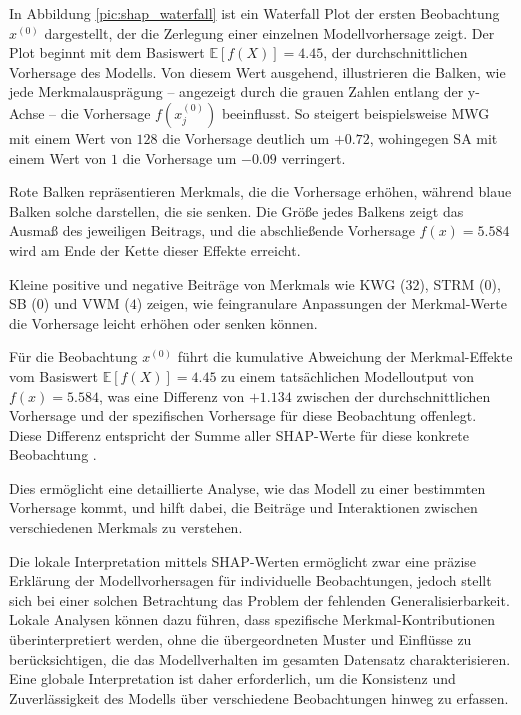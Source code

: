 In Abbildung \ref{pic:shap_waterfall} ist ein Waterfall Plot der ersten Beobachtung $x^{(0)}$ dargestellt, 
der die Zerlegung einer einzelnen Modellvorhersage zeigt. Der Plot beginnt mit dem Basiswert $\mathbb{E}[f(X)] = 4.45$, 
der durchschnittlichen Vorhersage des Modells.
Von diesem Wert ausgehend, illustrieren die Balken, wie jede Merkmalausprägung – 
angezeigt durch die grauen Zahlen entlang der y-Achse – die Vorhersage $f(x_{j}^{(0)})$ beeinflusst. 
So steigert beispielsweise MWG mit einem Wert von $128$ die Vorhersage deutlich um $+0.72$, 
wohingegen SA mit einem Wert von $1$ die Vorhersage um $-0.09$ verringert.

Rote Balken repräsentieren Merkmals, die die Vorhersage erhöhen, während blaue Balken solche 
darstellen, die sie senken. Die Größe jedes Balkens zeigt das Ausmaß des jeweiligen Beitrags, 
und die abschließende Vorhersage $f(x) = 5.584$ wird am Ende der Kette dieser Effekte erreicht. 

Kleine positive und negative Beiträge von Merkmals wie KWG ($32$), STRM ($0$), SB ($0$) und VWM ($4$) 
zeigen, wie feingranulare Anpassungen der Merkmal-Werte die Vorhersage leicht erhöhen oder senken können.

Für die Beobachtung $x^{(0)}$ führt die kumulative Abweichung der Merkmal-Effekte 
vom Basiswert $\mathbb{E}[f(X)] = 4.45$ zu einem tatsächlichen Modelloutput von $f(x) = 5.584$, 
was eine Differenz von $+1.134$ zwischen der durchschnittlichen Vorhersage 
und der spezifischen Vorhersage für diese Beobachtung offenlegt. 
Diese Differenz entspricht der Summe aller SHAP-Werte für diese konkrete Beobachtung \cite[S. 52f]{Molnar_2023}.

Dies ermöglicht eine detaillierte Analyse, wie das Modell zu einer bestimmten Vorhersage kommt, 
und hilft dabei, die Beiträge und Interaktionen zwischen verschiedenen Merkmals zu verstehen.

Die lokale Interpretation mittels SHAP-Werten ermöglicht zwar eine präzise Erklärung 
der Modellvorhersagen für individuelle Beobachtungen, jedoch stellt sich bei einer 
solchen Betrachtung das Problem der fehlenden Generalisierbarkeit. 
Lokale Analysen können dazu führen, dass spezifische Merkmal-Kontributionen überinterpretiert werden, 
ohne die übergeordneten Muster und Einflüsse zu berücksichtigen, 
die das Modellverhalten im gesamten Datensatz charakterisieren. 
Eine globale Interpretation ist daher erforderlich, um die Konsistenz und Zuverlässigkeit 
des Modells über verschiedene Beobachtungen hinweg zu erfassen. 

